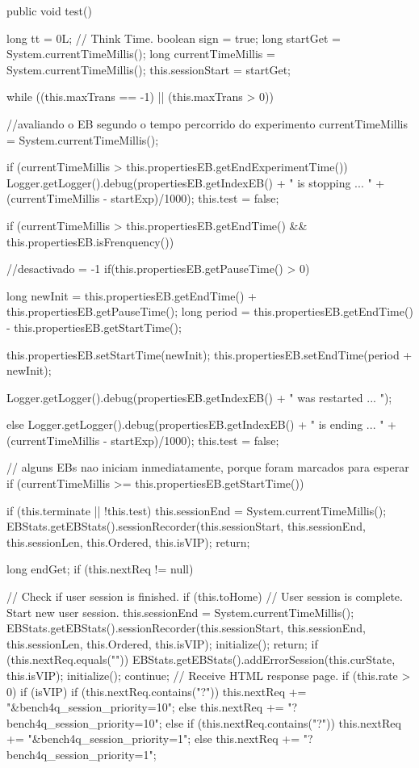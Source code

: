 \begin{codigo}[caption={Algoritmo de geração de carga modificado para modulação}, label={code:modelworkload}, breaklines=true]
	public void test() {
		long tt = 0L; // Think Time.
		boolean sign = true;
		long startGet = System.currentTimeMillis();
		long currentTimeMillis = System.currentTimeMillis();
		this.sessionStart = startGet;
		
		
		while ((this.maxTrans == -1) || (this.maxTrans > 0)) {
			
			//avaliando o EB segundo o tempo percorrido do experimento
			currentTimeMillis = System.currentTimeMillis();
			
			if (currentTimeMillis > this.propertiesEB.getEndExperimentTime()){
				Logger.getLogger().debug(propertiesEB.getIndexEB() + " is stopping ... " + (currentTimeMillis - startExp)/1000);
				this.test = false;
			}
			
			if (currentTimeMillis > this.propertiesEB.getEndTime() && this.propertiesEB.isFrenquency()) {
				//desactivado = -1
				if(this.propertiesEB.getPauseTime() > 0){
					long newInit = this.propertiesEB.getEndTime() + this.propertiesEB.getPauseTime();
					long period = this.propertiesEB.getEndTime() - this.propertiesEB.getStartTime();
					
					this.propertiesEB.setStartTime(newInit);
					this.propertiesEB.setEndTime(period + newInit);
					
					Logger.getLogger().debug(propertiesEB.getIndexEB() + " was restarted  ... ");
				}else{
				Logger.getLogger().debug(propertiesEB.getIndexEB() + " is ending ... " + (currentTimeMillis - startExp)/1000);
				this.test = false;
			}
		}
		
		// alguns EBs nao iniciam inmediatamente, porque foram marcados para esperar
		if (currentTimeMillis >= this.propertiesEB.getStartTime()) {
			if (this.terminate || !this.test) {
				this.sessionEnd = System.currentTimeMillis();
				EBStats.getEBStats().sessionRecorder(this.sessionStart, this.sessionEnd, this.sessionLen,
				this.Ordered, this.isVIP);
				return;
			}
			
			long endGet;
			if (this.nextReq != null) {
				// Check if user session is finished.
				if (this.toHome) {
					// User session is complete. Start new user session.
					this.sessionEnd = System.currentTimeMillis();
					EBStats.getEBStats().sessionRecorder(this.sessionStart, this.sessionEnd, this.sessionLen,
					this.Ordered, this.isVIP);
					initialize();
					return;
				}
				if (this.nextReq.equals("")) {
					EBStats.getEBStats().addErrorSession(this.curState, this.isVIP);
					initialize();
					continue;
				}
				// Receive HTML response page.
				if (this.rate > 0) {
					if (isVIP) {
						if (this.nextReq.contains("?")) {
							this.nextReq += "&bench4q_session_priority=10";
						} else {
						this.nextReq += "?bench4q_session_priority=10";
					}
				} else if (this.nextReq.contains("?")) {
				this.nextReq += "&bench4q_session_priority=1";
			} else {
			this.nextReq += "?bench4q_session_priority=1";
		}
	}
	
}}}}
\end{codigo}
